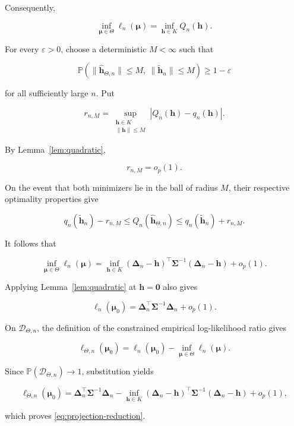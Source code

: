 \documentclass[11pt]{article}
\theoremstyle{remark}
\newcommand{\Pp}{\mathbb{P}}
\begin{document}
Consequently,

$$ \inf_{\boldsymbol{\mu}\in\Theta}\ell_n(\boldsymbol{\mu})=\inf_{\boldsymbol{h}\in K}Q_n(\boldsymbol{h}). $$

For every $\varepsilon>0$, choose a deterministic $M<\infty$ such that

$$ \Pp\left(\|\widehat{\boldsymbol{h}}_{\Theta,n}\|\leq M,\ \|\widetilde{\boldsymbol{h}}_n\|\leq M\right)\geq1-\varepsilon $$

for all sufficiently large $n$. Put

$$ r_{n,M}=\sup_{\substack{\boldsymbol{h}\in K\\\|\boldsymbol{h}\|\leq M}}|Q_n(\boldsymbol{h})-q_n(\boldsymbol{h})|. $$

By Lemma~\ref{lem:quadratic},

$$ r_{n,M}=o_p(1). $$

On the event that both minimizers lie in the ball of radius $M$, their respective optimality properties give

$$ q_n(\widetilde{\boldsymbol{h}}_n)-r_{n,M}\leq Q_n(\widehat{\boldsymbol{h}}_{\Theta,n})\leq q_n(\widetilde{\boldsymbol{h}}_n)+r_{n,M}. $$

It follows that

$$ \inf_{\boldsymbol{\mu}\in\Theta}\ell_n(\boldsymbol{\mu})=\inf_{\boldsymbol{h}\in K}(\boldsymbol{\Delta}_n-\boldsymbol{h})^\top\boldsymbol{\Sigma}^{-1}(\boldsymbol{\Delta}_n-\boldsymbol{h})+o_p(1). $$

Applying Lemma~\ref{lem:quadratic} at $\boldsymbol{h}=\boldsymbol{0}$ also gives

$$ \ell_n(\boldsymbol{\mu}_0)=\boldsymbol{\Delta}_n^\top\boldsymbol{\Sigma}^{-1}\boldsymbol{\Delta}_n+o_p(1). $$

On $\mathcal{D}_{\Theta,n}$, the definition of the constrained empirical log-likelihood ratio gives

$$ \ell_{\Theta,n}(\boldsymbol{\mu}_0)=\ell_n(\boldsymbol{\mu}_0)-\inf_{\boldsymbol{\mu}\in\Theta}\ell_n(\boldsymbol{\mu}). $$

Since $\Pp(\mathcal{D}_{\Theta,n})\to1$, substitution yields

$$ \ell_{\Theta,n}(\boldsymbol{\mu}_0)=\boldsymbol{\Delta}_n^\top\boldsymbol{\Sigma}^{-1}\boldsymbol{\Delta}_n-\inf_{\boldsymbol{h}\in K}(\boldsymbol{\Delta}_n-\boldsymbol{h})^\top\boldsymbol{\Sigma}^{-1}(\boldsymbol{\Delta}_n-\boldsymbol{h})+o_p(1), $$

which proves \eqref{eq:projection-reduction}.
\end{document}
